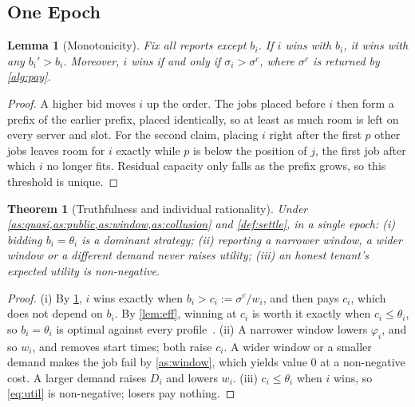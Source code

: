 \documentclass[journal]{IEEEtran}
\newtheorem{lemma}{Lemma}
\newtheorem{theorem}{Theorem}
\theoremstyle{remark}
\begin{document}
\subsection{One Epoch}
\begin{lemma}[Monotonicity]\label{lem:mono}
Fix all reports except $b_i$. If $i$ wins with $b_i$, it wins with any $b_i'>b_i$. Moreover, $i$ wins if and only if $\sigma_i>\sigma^c$, where $\sigma^c$ is returned by \cref{alg:pay}.
\end{lemma}
\begin{proof}
A higher bid moves $i$ up the order. The jobs placed before $i$ then form a prefix of the earlier prefix, placed identically, so at least as much room is left on every server and slot. For the second claim, placing $i$ right after the first $p$ other jobs leaves room for $i$ exactly while $p$ is below the position of $j$, the first job after which $i$ no longer fits. Residual capacity only falls as the prefix grows, so this threshold is unique.
\end{proof}

\begin{theorem}[Truthfulness and individual rationality]\label{thm:dsic}
Under \cref{as:quasi,as:public,as:window,as:collusion} and \cref{def:settle}, in a single epoch: (i) bidding $b_i=\theta_i$ is a dominant strategy; (ii) reporting a narrower window, a wider window or a different demand never raises utility; (iii) an honest tenant's expected utility is non-negative.
\end{theorem}
\begin{proof}
(i) By \cref{lem:mono}, $i$ wins exactly when $b_i>c_i:=\sigma^c/w_i$, and then pays $c_i$, which does not depend on $b_i$. By \cref{lem:eff}, winning at $c_i$ is worth it exactly when $c_i\le\theta_i$, so $b_i=\theta_i$ is optimal against every profile~\cite{myerson1981,lehmann2002}. (ii) A narrower window lowers $\varphi_i$, and so $w_i$, and removes start times; both raise $c_i$. A wider window or a smaller demand makes the job fail by \cref{as:window}, which yields value $0$ at a non-negative cost. A larger demand raises $D_i$ and lowers $w_i$. (iii) $c_i\le\theta_i$ when $i$ wins, so \eqref{eq:util} is non-negative; losers pay nothing.
\end{proof}
\end{document}
